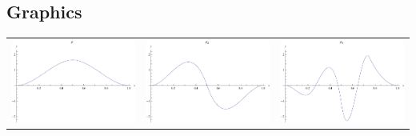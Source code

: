 \documentclass{article}
\begin{document}
\begin{landscape}
\subsection{Graphics}
\begin{tabular}{ccc}
\includegraphics[width=6.7cm]{cubic_bspline_1.pdf}& \includegraphics[width=6.7cm]{cubic_bspline_2.pdf}& \includegraphics[width=6.7cm]{cubic_bspline_3.pdf} \\

\end{tabular}
\end{landscape}
\end{document}
